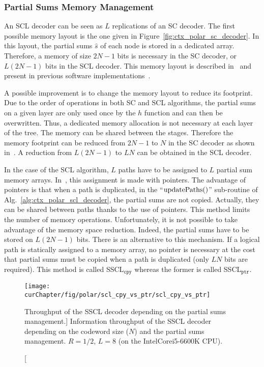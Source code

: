 \subsubsection{Partial Sums Memory Management}
\label{sec:opt_polar_scl_partial_sum}

An SCL decoder can be seen as $L$ replications of an SC decoder. The first
possible memory layout is the one given in
Figure~\ref{fig:ctx_polar_sc_decoder}. In this layout, the partial sums
$\hat{s}$ of each node is stored in a dedicated array. Therefore, a memory of
size $2N-1$ bits is necessary in the SC decoder, or $L(2N -1)$ bits in the SCL
decoder. This memory layout is described in~\cite{Tal2011} and present in
previous software implementations~\cite{Sarkis2014b,Sarkis2016,Shen2016}.

A possible improvement is to change the memory layout to reduce its footprint.
Due to the order of operations in both SC and SCL algorithms, the partial sums
on a given layer are only used once by the $h$ function and can then be
overwritten. Thus, a dedicated memory allocation is not necessary at each layer
of the tree. The memory can be shared between the stages. Therefore the memory
footprint can be reduced from $2N-1$ to $N$ in the SC decoder as shown
in~\cite{Leroux2013}. A reduction from $L(2N -1)$ to $LN$ can be obtained in the
SCL decoder.

In the case of the SCL algorithm, $L$ paths have to be assigned to $L$ partial
sum memory arrays. In~\cite{Tal2011}, this assignment is made with pointers. The
advantage of pointers is that when a path is duplicated, in the
``$\operatorname*{updatePaths}()$'' sub-routine of Alg.~\ref{alg:ctx_polar_scl_decoder}, the
partial sums are not copied. Actually, they can be shared between paths thanks
to the use of pointers. This method limits the number of memory operations.
Unfortunately, it is not possible to take advantage of the memory space
reduction. Indeed, the partial sums have to be stored on $L(2N -1)$ bits. There
is an alternative to this mechanism. If a logical path is statically assigned to
a memory array, no pointer is necessary at the cost that partial sums must be
copied when a path is duplicated (only $LN$ bits are required). This method is
called SSCL$_{\texttt{cpy}}$ whereas the former is called SSCL$_{\texttt{ptr}}$.

\begin{figure}[htp]
  \centering
  \texttt{[image: \\curChapter/fig/polar/scl\_cpy\_vs\_ptr/scl\_cpy\_vs\_ptr]}
  \caption
    [Throughput of the SSCL decoder depending on the partial sums management.]
    {Information throughput of the SSCL decoder depending on the codeword
    size ($N$) and the partial sums management. $R = 1 / 2$, $L = 8$ (on the
    Intel\R Core\TM i5-6600K CPU).}
  \label{plot:opt_polar_scl_cpy_vs_ptr}
\end{figure}

